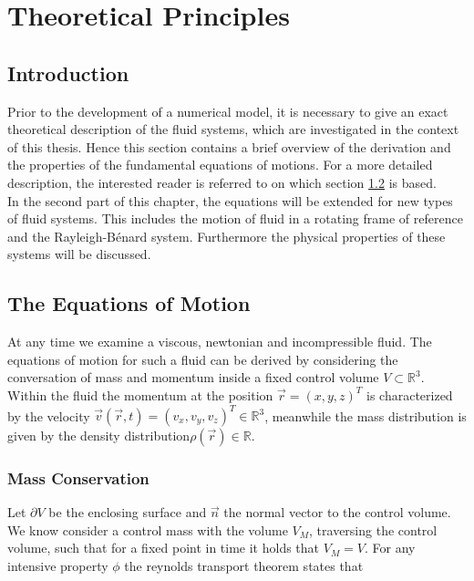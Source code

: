 \chapter{Theoretical Principles}

\section{Introduction}

Prior to the development of a numerical model, it is necessary to give an exact theoretical description of the
fluid systems, which are investigated in the context of this thesis.
Hence this section contains a brief overview of the derivation and the properties of the fundamental equations of motions.
For a more detailed description, the interested reader is referred to \citep{ferziger99} on which section \ref{theorie:eqm1} is based.\\
In the second part of this chapter, the equations will be extended for new types of fluid systems.
This includes the motion of fluid in a rotating frame of reference and the Rayleigh-B\'{e}nard system.
Furthermore the physical properties of these systems will be discussed.

\section{The Equations of Motion}\label{theorie:eqm1}

At any time we examine a viscous, newtonian and incompressible fluid. The equations of motion for such a fluid can be derived by considering the conversation of
mass and momentum inside a fixed control volume $V \subset \mathbb{R}^3$.
Within the fluid the momentum at the position $\vec{r} = (x, y, z)^T$  is  characterized by the velocity $\vec{v}(\vec{r}, t) = (v_x, v_y, v_z)^T \in \mathbb{R}^3$,
meanwhile the mass distribution is given by the density distribution$\rho(\vec{r}) \in \mathbb{R}$.

\subsection{Mass Conservation}

Let $\partial V$ be the enclosing surface and $\vec{n}$ the normal vector to the control volume.
We know consider a control mass with the volume $V_M$, traversing the control volume, such that for a fixed point in time it holds that $V_M = V$.
For any intensive property $\phi$ the reynolds transport theorem states that

